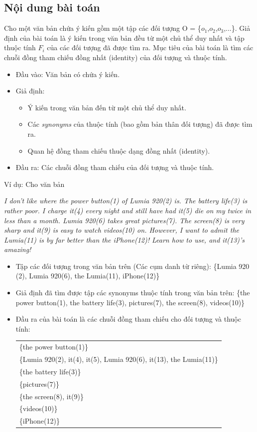 \documentclass[12pt]{extarticle}
\begin{document}
		\subsection{Nội dung bài toán}
			\par Cho một văn bản chứa ý kiến gồm một tập các đối tượng O = \{$o_1$,$o_2$,$o_3$,...\}. Giả định của bài toán là ý kiến trong văn bản đều từ một chủ thể duy nhất và tập thuộc tính $F_i$ của các đối tượng đã được tìm ra. Mục tiêu của bài toán là tìm các chuỗi đồng tham chiếu đồng nhất (identity) của đối tượng và thuộc tính.
			\begin{itemize}
				\item{Đầu vào: Văn bản có chứa ý kiến.}
				\item{Giả định:
				\begin{itemize}
					\item{Ý kiến trong văn bản đến từ một chủ thể duy nhất.}
					\item{Các \textit{synonyms} của thuộc tính (bao gồm bản thân đối tượng) đã được tìm ra.}
					\item{Quan hệ đồng tham chiếu thuộc dạng đồng nhất (identity).}
				\end{itemize}}
				\item{Đầu ra: Các chuỗi đồng tham chiếu của đối tượng và thuộc tính.}
			\end{itemize}
			\par Ví dụ: Cho văn bản \\
			\par \textit{I don't like where the power button(1) of Lumia 920(2) is. The battery life(3) is rather poor. I charge it(4) every night and still have had it(5) die on my twice in less than a month. Lumia 920(6) takes great pictures(7). The screen(8) is very sharp and it(9) is easy to watch videos(10) on. However, I want to admit the Lumia(11) is by far better than the iPhone(12)! Learn how to use, and it(13)'s amazing!}	
			\begin{itemize}		
			\item{Tập các đối tượng trong văn bản trên (Các cụm danh từ riêng): \{Lumia 920 (2), Lumia 920(6), the Lumia(11), iPhone(12)\}}
			\item{Giả định đã tìm được tập các synonyms thuộc tính trong văn bản trên: \{the power button(1), the battery life(3), pictures(7), the screen(8), videos(10)\}}
			\item{Đầu ra của bài toán là các chuỗi đồng tham chiếu cho đối tượng và thuộc tính:						
				\begin{center}
					\begin{tabular}{l}
						\{the power button(1)\}
						\\\{Lumia 920(2), it(4), it(5), Lumia 920(6), it(13), the Lumia(11)\}
						\\\{the battery life(3)\}
						\\\{pictures(7)\}
						\\\{the screen(8), it(9)\}
						\\\{videos(10)\}
						\\\{iPhone(12)\}
					\end{tabular}
			 	\end{center}}
		 	\end{itemize}
\end{document}
